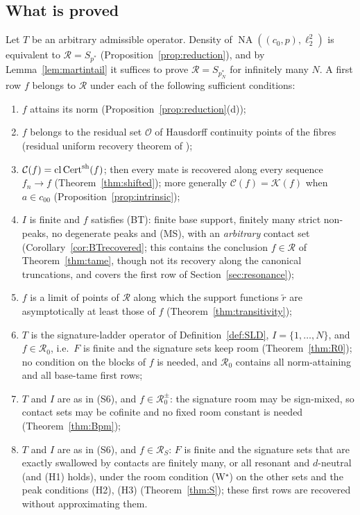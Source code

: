 \documentclass[10pt]{amsart}
\theoremstyle{definition}
\theoremstyle{remark}
\newcommand{\NA}{\operatorname{NA}}
\newcommand{\Cset}{\mathcal C}
\newcommand{\Cert}{\operatorname{Cert}}
\newcommand{\cl}{\operatorname{cl}}
\newcommand{\Rec}{\mathcal R}
\begin{document}
\subsection{What is proved}
Let $T$ be an arbitrary admissible operator.  Density of
$\NA((c_0,p),\ell_2^2)$ is equivalent to $\Rec=S_{p^*}$
(Proposition~\ref{prop:reduction}), and by Lemma~\ref{lem:martintail} it
suffices to prove $\Rec=S_{p_N^*}$ for infinitely many $N$.  A first row
$f$ belongs to $\Rec$ under each of the following sufficient conditions:
\begin{enumerate}
\item[(S1)] $f$ attains its norm (Proposition~\ref{prop:reduction}(d));
\item[(S2)] $f$ belongs to the residual set $\mathcal O$ of Hausdorff continuity
points of the fibres (residual uniform recovery theorem of \cite{PrA});
\item[(S3)] $\Cset(f)=\cl\Cert^{\rm sh}(f)$; then every mate is recovered
along every sequence $f_n\to f$ (Theorem~\ref{thm:shifted}); more generally
$\Cset(f)=\mathcal K(f)$ when $a\in c_{00}$ (Proposition~\ref{prop:intrinsic});
\item[(S4)] $I$ is finite and $f$ satisfies \textup{(BT)}: finite base support,
finitely many strict non-peaks, no degenerate peaks and \textup{(MS)}, with
an \emph{arbitrary} contact set (Corollary~\ref{cor:BTrecovered}; this
contains the conclusion $f\in\Rec$ of Theorem~\ref{thm:tame}, though not its
recovery along the canonical truncations, and covers the first row of
Section~\ref{sec:resonance});
\item[(S5)] $f$ is a limit of points of $\Rec$ along which the support
functions $\tilde r$ are asymptotically at least those of $f$
(Theorem~\ref{thm:transitivity});
\item[(S6)] $T$ is the signature-ladder operator of
Definition~\ref{def:SLD}, $I=\{1,\dots,N\}$, and $f\in\mathcal R_0$, i.e.\
$F$ is finite and the signature sets keep room (Theorem~\ref{thm:R0}); no
condition on the blocks of $f$ is needed, and $\mathcal R_0$ contains all
norm-attaining and all base-tame first rows;
\item[(S7)] $T$ and $I$ are as in (S6), and $f\in\mathcal R_0^\pm$: the
signature room may be sign-mixed, so contact sets may be cofinite and no
fixed room constant is needed (Theorem~\ref{thm:Bpm});
\item[(S8)] $T$ and $I$ are as in (S6), and $f\in\mathcal R_S$: $F$ is
finite and the signature sets that are exactly swallowed by contacts are
finitely many, or all resonant and $d$-neutral (and \textup{(H1)}
holds), under the room condition
\textup{(W$^\star$)} on the other sets and the peak conditions
\textup{(H2)}, \textup{(H3)} (Theorem~\ref{thm:S}); these first rows are
recovered without approximating them.
\end{enumerate}
\end{document}
